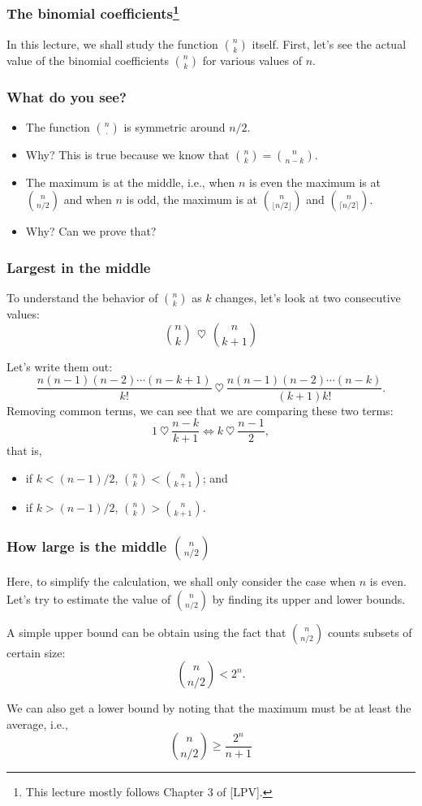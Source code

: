 

\begin{frame}\frametitle{The binomial coefficients\footnote{This lecture mostly follows Chapter 3 of [LPV].}}
  In this lecture, we shall study the function $\binom{n}{k}$ itself.
  First, let's see the actual value of the binomial coefficients
  $\binom{n}{k}$ for various values of $n$.
  \vspace{2in}
\end{frame}

\begin{frame}\frametitle{What do you see?}
  \begin{itemize}
  \item The function $\binom{n}{\cdot}$ is symmetric around $n/2$.
  \item Why? \pause This is true because we know that $\binom{n}{k}=\binom{n}{n-k}$. \pause
  \item The maximum is at the middle, i.e., when $n$ is even the
    maximum is at $\binom{n}{n/2}$ and when $n$ is odd, the maximum is
    at $\binom{n}{\lfloor n/2 \rfloor}$ and $\binom{n}{\lceil
      n/2\rceil}$.
  \item Why? \pause Can we prove that?
  \end{itemize}
\end{frame}

\begin{frame}\frametitle{Largest in the middle}
  To understand the behavior of $\binom{n}{k}$ as $k$ changes, let's
  look at two consecutive values:
  \[ \binom{n}{k} \ \ \heartsuit \ \ \binom{n}{k+1}\]
  \pause

  Let's write them out:
  \[ \frac{n(n-1)(n-2)\cdots(n-k+1)}{k!} \ \heartsuit \ \frac{n(n-1)(n-2)\cdots(n-k)}{(k+1)k!}.\]
  \pause
  Removing common terms, we can see that we are comparing these two terms:
  \[ 1 \ \heartsuit \ \frac{n-k}{k+1} \Leftrightarrow k \ \heartsuit \ \frac{n-1}{2},\]
  that is, \pause
  \begin{itemize}
  \item if $k<(n-1)/2$, $\binom{n}{k} < \binom{n}{k+1}$; and
  \item if $k>(n-1)/2$, $\binom{n}{k} > \binom{n}{k+1}$.
  \end{itemize}
\end{frame}

\begin{frame}\frametitle{How large is the middle $\binom{n}{n/2}$}
  Here, to simplify the calculation, we shall only consider the case
  when $n$ is even. Let's try to estimate the value of
  $\binom{n}{n/2}$ by finding its upper and lower bounds.
  \pause

  A simple upper bound can be obtain using the fact that
  $\binom{n}{n/2}$ counts subsets of certain size:
  \[\binom{n}{n/2} < 2^n.\]
  \pause

  We can also get a lower bound by noting that the maximum must be at
  least the average, i.e.,
  \[\binom{n}{n/2} \geq \frac{2^n}{n+1}\]
\end{frame}

